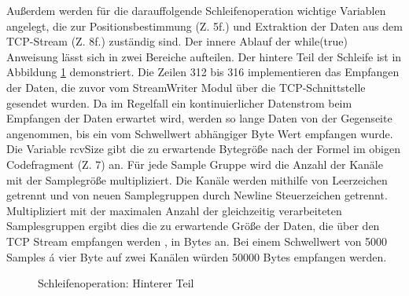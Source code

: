 Außerdem werden für die darauffolgende Schleifenoperation wichtige Variablen angelegt, die zur Positionsbestimmung (Z. 5f.) und Extraktion der Daten aus dem TCP-Stream (Z. 8f.) zuständig sind. Der innere Ablauf der while(true) Anweisung lässt sich in zwei Bereiche aufteilen. Der hintere Teil der Schleife ist in Abbildung \ref{fig:whileFirst} demonstriert. Die Zeilen 312 bis 316 implementieren das Empfangen der Daten, die zuvor vom StreamWriter Modul über die TCP-Schnittstelle gesendet wurden. Da im Regelfall ein kontinuierlicher Datenstrom beim Empfangen der Daten erwartet wird, werden so lange Daten von der Gegenseite angenommen, bis ein vom Schwellwert abhängiger Byte Wert empfangen wurde. Die Variable rcvSize gibt die zu erwartende Bytegröße nach der Formel im obigen Codefragment (Z. 7) an. Für jede Sample Gruppe wird die Anzahl der Kanäle mit der Samplegröße multipliziert. Die Kanäle werden mithilfe von Leerzeichen getrennt und von neuen Samplegruppen durch Newline Steuerzeichen getrennt. Multipliziert mit der maximalen Anzahl der gleichzeitig verarbeiteten Samplesgruppen ergibt dies die zu erwartende Größe der Daten, die über den TCP Stream empfangen werden , in Bytes an. Bei einem Schwellwert von 5000 Samples á vier Byte auf zwei Kanälen würden 50000
Bytes empfangen werden.

\begin{figure}[t!]
	
	\caption{Schleifenoperation: Hinterer Teil}
	\label{fig:whileFirst}
\end{figure}

